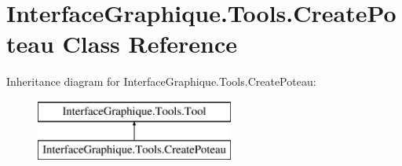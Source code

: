 \hypertarget{class_interface_graphique_1_1_tools_1_1_create_poteau}{}\section{Interface\+Graphique.\+Tools.\+Create\+Poteau Class Reference}
\label{class_interface_graphique_1_1_tools_1_1_create_poteau}
Inheritance diagram for Interface\+Graphique.\+Tools.\+Create\+Poteau\+:\begin{figure}[H]
\begin{center}
\leavevmode
\includegraphics[height=2.000000cm]{class_interface_graphique_1_1_tools_1_1_create_poteau}
\end{center}
\end{figure}
